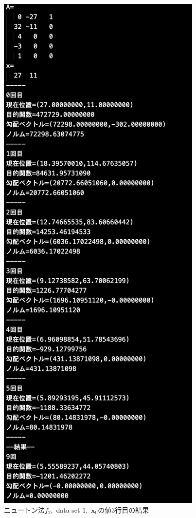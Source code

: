 \documentclass[12pt]{jarticle}
\begin{document}
\begin{figure}[h]
    \begin{center}
        \includegraphics[scale=0.2]{kadai1_2n_out1_3_1.png}
    \end{center}
    \caption{ニュートン法$f_2$,\ data set 1,\ $\boldsymbol{x}_0$の値3行目の結果}
\end{figure}
\end{document}
